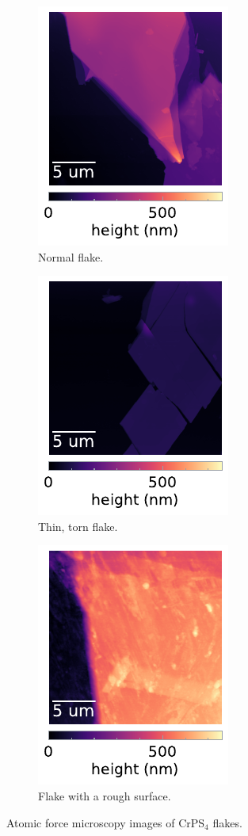 \documentclass[
	twoside,
	parskip=half,
	a4paper,
]{scrbook}
\begin{document}
\begin{figure}
	\centering
	\begin{subfigure}[t]{1.8in}
		\includegraphics{../figures/2024-04-19 AFM (a).pdf}
		\caption{Normal flake.}
		\label{fig:AFM normal}
	\end{subfigure}
	\begin{subfigure}[t]{1.8in}
		\includegraphics{../figures/2024-04-19 AFM (b).pdf}
		\caption{Thin, torn flake.}
		\label{fig:AFM torn}
	\end{subfigure}
	\begin{subfigure}[t]{1.8in}
		\includegraphics{../figures/2024-04-19 AFM (c).pdf}
		\caption{Flake with a rough surface.}
		\label{fig:AFM rough}
	\end{subfigure}
	\caption{Atomic force microscopy images of CrPS$_4$ flakes.}
	\label{fig:AFM}
\end{figure}
\end{document}

